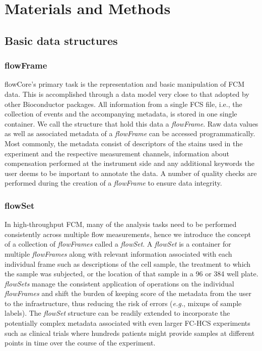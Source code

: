 \documentclass[12pt]{article}
\newcommand{\Rpackage}[1]{{\textsf{#1}}}
\newcommand{\Rclass}[1]{{\textit{#1}}}
\begin{document}
\section*{Materials and Methods}
\subsection*{Basic data structures}
\subsubsection*{flowFrame}

\Rpackage{flowCore}'s primary task is the representation and basic
manipulation of FCM data. This is accomplished through a data model
very close to that adopted by other Bioconductor packages. All
information from a single FCS file, i.e., the collection of events and
the accompanying metadata, is stored in one single container. We call
the structure that hold this data a \Rclass{flowFrame}. Raw data
values as well as associated metadata of a \Rclass{flowFrame} can be
accessed programmatically. Most commonly, the metadata consist of
descriptors of the stains used in the experiment and the respective
measurement channels, information about compensation performed at the
instrument side and any additional keywords the user deems to be
important to annotate the data. A number of quality checks are
performed during the creation of a \Rclass{flowFrame} to ensure data
integrity.

\subsubsection*{flowSet}
In high-throughput FCM, many of the analysis tasks need to be
performed consistently across multiple flow measurements, hence we
introduce the concept of a collection of \Rclass{flowFrames} called a
\Rclass{flowSet}. A \Rclass{flowSet} is a container for multiple
\Rclass{flowFrames} along with relevant information associated with
each individual frame such as descriptions of the cell sample, the
treatment to which the sample was subjected, or the location of that
sample in a 96 or 384 well plate.  \Rclass{flowSets} manage the
consistent application of operations on the individual
\Rclass{flowFrames} and shift the burden of keeping score of the
metadata from the user to the infrastructure, thus reducing the risk
of errors (\textit{e.g.}, mixups of sample labels). The
\Rclass{flowSet} structure can be readily extended to incorporate the
potentially complex metadata associated with even larger FC-HCS
experiments such as clinical trials where hundreds patients might
provide samples at different points in time over the course of the
experiment.
\end{document}
